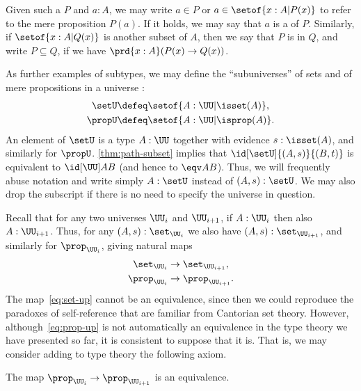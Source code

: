 Given such a $P$ and $a:A$, we may write $a\in P$ or $a\in \setof{x:A | P(x)}$ to refer to the mere proposition $P(a)$.
If it holds, we may say that $a$ is a  of $P$.
Similarly, if $\setof{x:A | Q(x)}$ is another subset of $A$, then we say that $P$ is 
%
%
in $Q$, and write $P\subseteq Q$, if we have $\prd{x:A}(P(x)\rightarrow Q(x))$.

As further examples of subtypes, we may define the ``subuniverses'' of sets and of mere propositions in a universe \UU:
\begin{align*}
  \setU &\defeq \setof{A:\UU | \isset(A) },\\
  \propU &\defeq \setof{A:\UU | \isprop(A) }.
\end{align*}
An element of $\setU$ is a type $A:\UU$ together with evidence $s:\isset(A)$, and similarly for $\propU$.
\cref{thm:path-subset} implies that $\id[\setU]{(A,s)}{(B,t)}$ is equivalent to $\id[\UU]AB$ (and hence to $\eqv AB$).
Thus, we will frequently abuse notation and write simply $A:\setU$ instead of $(A,s):\setU$.
We may also drop the subscript \UU if there is no need to specify the universe in question.

Recall that for any two universes $\UU_i$ and $\UU_{i+1}$, if $A:\UU_i$ then also $A:\UU_{i+1}$.
Thus, for any $(A,s):\set_{\UU_i}$ we also have $(A,s):\set_{\UU_{i+1}}$, and similarly for $\prop_{\UU_i}$, giving natural maps
\begin{align}
  \set_{\UU_i} &\to \set_{\UU_{i+1}}\label{eq:set-up},\\
  \prop_{\UU_i} &\to \prop_{\UU_{i+1}}.\label{eq:prop-up}
\end{align}
The map~\eqref{eq:set-up} cannot be an equivalence, since then we could reproduce the paradoxes of self-reference that are familiar from Cantorian set theory.
However, although~\eqref{eq:prop-up} is not automatically an equivalence in the type theory we have presented so far, it is consistent to suppose that it is.
That is, we may consider adding to type theory the following axiom.

\begin{axiom}
  The map $\prop_{\UU_i} \to \prop_{\UU_{i+1}}$ is an equivalence.
\end{axiom}

